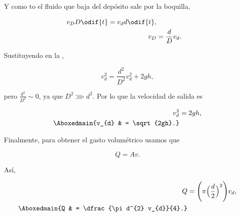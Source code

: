 \documentclass[../main.tex]{subfiles}
\begin{document}
\begin{problema}
	Y como to el fluido que baja del depósito sale por la boquilla,

	\begin{align*}
		v_{D}D \odif{t} = v_{d}d \odif{t}, \\
		v_{D} & = \dfrac{d}{D}v_{d}.
	\end{align*}

	Sustituyendo en la ,

	\begin{equation*}
		v_{d}^{2} = \dfrac{d^{2}}{D^{2}}v_{d}^{2} + 2gh,
	\end{equation*}

	pero \(\tfrac{d^{2}}{D^{2}} \sim 0\), ya que \(D^{2} \ggg d^{2}\). Por lo que
	la velocidad de salida es

	\begin{align*}
		v_{d}^{2}         & = 2gh,         \\
		\Aboxedmain{v_{d} & = \sqrt{2gh}.}
	\end{align*}

	Finalmente, para obtener el gasto volumétrico usamos que

	\begin{equation*}
		Q = Av.
	\end{equation*}

	Así,

	\begin{align*}
		Q             & = \Biggl(\pi \Bigl(\dfrac{d}{2}\Bigr)^{2}\Biggr)v_{d}, \\
		\Aboxedmain{Q & = \dfrac{\pi d^{2} v_{d}}{4}.}
	\end{align*}
\end{problema}
\end{document}

